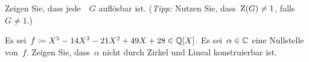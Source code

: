 \documentclass{scrartcl}
\begin{document}
\begin{exercise}
  Zeigen Sie, dass jede~~$G$ auflösbar ist.
  (\emph{Tipp:} Nutzen Sie, dass~$\operatorname{Z}(G) \neq 1$, falls~$G \neq 1$.)
\end{exercise}

\begin{exercise}[subtitle = {Erstklausur~19/20}]
  Es sei~$f \coloneqq X^5 - 14 X^3 - 21 X^2 + 49 X + 28 \in \mathbb{Q}[X]$.
  Es sei~$\alpha \in \mathbb{C}$ eine Nullstelle von~$f$.
  Zeigen Sie, dass~$\alpha$ nicht durch Zirkel und Lineal konstruierbar ist.
\end{exercise}
\end{document}
